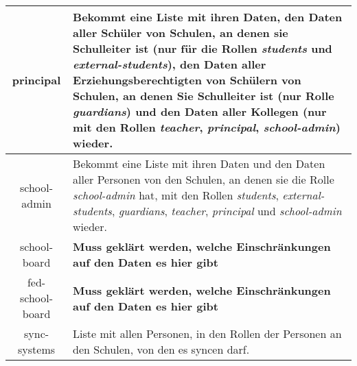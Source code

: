 \begin{longtable}{|c|p{}|}
principal & Bekommt eine Liste mit ihren Daten,
            den Daten aller Schüler von Schulen, an denen sie Schulleiter ist (nur für die Rollen \textit{students} und \textit{external-students}),
						den Daten aller Erziehungsberechtigten von Schülern von Schulen, an denen Sie Schulleiter ist (nur Rolle \textit{guardians}) und
					  den Daten aller Kollegen (nur mit den Rollen \textit{teacher}, \textit{principal}, \textit{school-admin})
						wieder.\\ \hline
school-admin & Bekommt eine Liste mit ihren Daten und
               den Daten aller Personen von den Schulen, an denen sie die Rolle \textit{school-admin} hat, mit den Rollen \textit{students}, \textit{external-students}, \textit{guardians}, \textit{teacher}, \textit{principal} und \textit{school-admin} wieder.  \\ \hline
school-board & \textcolor[rgb]{1,0.41,0.13}{\textbf{Muss geklärt werden, welche Einschränkungen auf den Daten es hier gibt}} \\ \hline
fed-school-board & \textcolor[rgb]{1,0.41,0.13}{\textbf{Muss geklärt werden, welche Einschränkungen auf den Daten es hier gibt}} \\ \hline
sync-systems & Liste mit allen Personen, in den Rollen der Personen an den Schulen, von den es syncen darf. \\ \hline
	\end{longtable}
